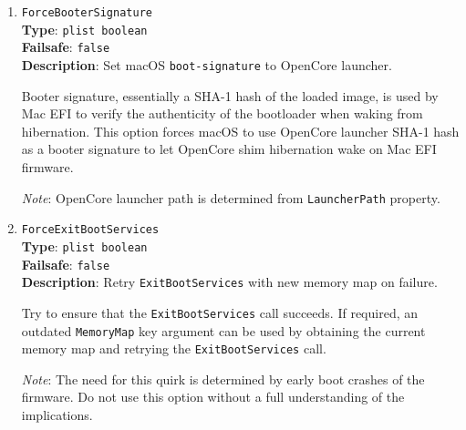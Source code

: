\documentclass[]{article}
\providecommand{\tightlist}{%
  \setlength{\itemsep}{0pt}\setlength{\parskip}{0pt}}
\begin{document}
\begin{enumerate}
  \emph{Note 2}: When enabled, and when not processing for Apple secure boot, this quirk
  is applied to:
    \begin{itemize}
      \tightlist
      \item All images from Apple Fat binaries (32-bit and 64-bit versions in one image).
      \item All Apple-signed images.
      \item All images at
      \texttt{\textbackslash System\textbackslash Library\textbackslash CoreServices\textbackslash boot.efi}
      within their filesystem.
    \end{itemize}

  \emph{Note 3}: This quirk is needed for Mac OS X 10.4 to macOS 10.12 (and
  higher, if Apple secure boot is not enabled), but only when the firmware
  itself includes a modern, more secure PE COFF image loader. This applies to
  current builds of OpenDuet, and to OVMF if built from audk source code.

\item
  \texttt{ForceBooterSignature}\\
  \textbf{Type}: \texttt{plist\ boolean}\\
  \textbf{Failsafe}: \texttt{false}\\
  \textbf{Description}: Set macOS \texttt{boot-signature} to OpenCore launcher.

  Booter signature, essentially a SHA-1 hash of the loaded image, is used by Mac EFI
  to verify the authenticity of the bootloader when waking from hibernation. This
  option forces macOS to use OpenCore launcher SHA-1 hash as a booter signature to let
  OpenCore shim hibernation wake on Mac EFI firmware.

  \emph{Note}: OpenCore launcher path is determined from \texttt{LauncherPath} property.

\item
  \texttt{ForceExitBootServices}\\
  \textbf{Type}: \texttt{plist\ boolean}\\
  \textbf{Failsafe}: \texttt{false}\\
  \textbf{Description}: Retry \texttt{ExitBootServices} with new memory map on failure.

  Try to ensure that the \texttt{ExitBootServices} call succeeds. If required, an
  outdated \texttt{MemoryMap} key argument can be used by obtaining the current
  memory map and retrying the \texttt{ExitBootServices} call.

  \emph{Note}: The need for this quirk is determined by early boot crashes of the
  firmware. Do not use this option without a full understanding of the implications.


\end{enumerate}
\end{document}
